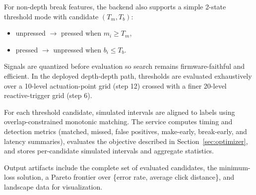 For non-depth break features, the backend also supports a simple 2-state threshold mode with candidate $(T_m, T_b)$:

\begin{itemize}
  \item unpressed $\rightarrow$ pressed when $m_i \ge T_m$,
  \item pressed $\rightarrow$ unpressed when $b_i \le T_b$.
\end{itemize}

Signals are quantized before evaluation so search remains firmware-faithful and efficient. In the deployed depth-depth path, thresholds are evaluated exhaustively over a 10-level actuation-point grid (step 12) crossed with a finer 20-level reactive-trigger grid (step 6).

For each threshold candidate, simulated intervals are aligned to labels using overlap-constrained monotonic matching. The service computes timing and detection metrics (matched, missed, false positives, make-early, break-early, and latency summaries), evaluates the objective described in Section~\ref{sec:optimizer}, and stores per-candidate simulated intervals and aggregate statistics.

Output artifacts include the complete set of evaluated candidates, the minimum-loss solution, a Pareto frontier over \{error rate, average click distance\}, and landscape data for visualization.
